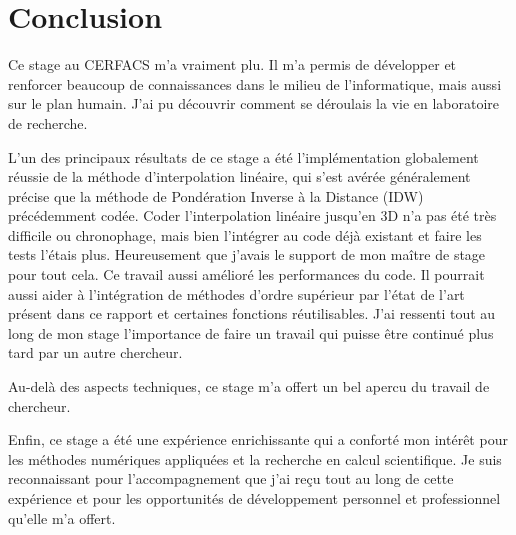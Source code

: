 \chapter*{Conclusion}


Ce stage au CERFACS m'a vraiment plu. Il m'a permis de développer et renforcer beaucoup de connaissances dans le milieu de l'informatique, mais aussi sur le plan humain. J'ai pu découvrir comment se déroulais la vie en laboratoire de recherche.

L'un des principaux résultats de ce stage a été l'implémentation globalement réussie de la méthode d'interpolation linéaire, qui s'est avérée généralement précise que la méthode de Pondération Inverse à la Distance (IDW) précédemment codée.
Coder l'interpolation linéaire jusqu'en 3D n'a pas été très difficile ou chronophage, mais bien l'intégrer au code déjà existant et faire les tests l'étais plus. Heureusement que j'avais le support de mon maître de stage pour tout cela.
Ce travail aussi amélioré les performances du code.
Il pourrait aussi aider à l'intégration de méthodes d'ordre supérieur par l'état de l'art présent dans ce rapport et certaines fonctions réutilisables.
J'ai ressenti tout au long de mon stage l'importance de faire un travail qui puisse être continué plus tard par un autre chercheur.

Au-delà des aspects techniques, ce stage m'a offert un bel apercu du travail de chercheur.

Enfin, ce stage a été une expérience enrichissante qui a conforté mon intérêt pour les méthodes numériques appliquées et la recherche en calcul scientifique. Je suis reconnaissant pour l'accompagnement que j'ai reçu tout au long de cette expérience et pour les opportunités de développement personnel et professionnel qu'elle m'a offert.